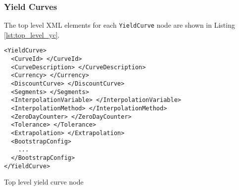 \subsubsection{Yield Curves}

The top level XML elements for each \lstinline!YieldCurve! node are shown in Listing \ref{lst:top_level_yc}.

\begin{listing}[H]
\begin{verbatim}
<YieldCurve>
  <CurveId> </CurveId>
  <CurveDescription> </CurveDescription>
  <Currency> </Currency>
  <DiscountCurve> </DiscountCurve>
  <Segments> </Segments>
  <InterpolationVariable> </InterpolationVariable>
  <InterpolationMethod> </InterpolationMethod>
  <ZeroDayCounter> </ZeroDayCounter>
  <Tolerance> </Tolerance>
  <Extrapolation> </Extrapolation>
  <BootstrapConfig>
    ...
  </BootstrapConfig>
</YieldCurve>
\end{verbatim}
\caption{Top level yield curve node}
\label{lst:top_level_yc}
\end{listing}

